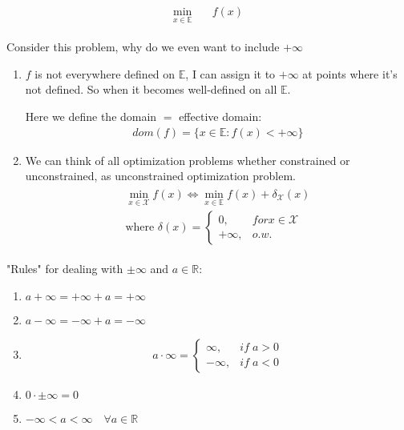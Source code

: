 \documentclass[11pt]{article}
\begin{document}
\begin{align*}
    \begin{aligned}
        \min_{x \in \mathbb{E}} &\quad f(x)
    \end{aligned}
\end{align*}

Consider this problem, why do we even want to include $+\infty$
\begin{enumerate}
    \item $f$ is not everywhere defined  on $\mathbb{E}$, I can assign it to $+\infty$ at points where it's not
    defined. So when it becomes well-defined on all $\mathbb{E}$.
    
    Here we define the domain $=$ effective domain:
    \begin{align*}
        dom(f) = \{ x \in \mathbb{E}: f(x) < +\infty \}
    \end{align*}
    \item We can think of all optimization problems whether constrained or unconstrained, as unconstrained optimization
    problem.
    \begin{align*}
        \begin{aligned}
            \min_{x\in \mathcal{X}}  f(x) \iff \min_{x \in \mathbb{E}} f(x) + \delta_{\mathcal{X}}(x)\\
            \text{where } \delta(x) = 
            \begin{cases} 
            0, &  for x \in \mathcal{X}\\ 
            +\infty, &  o.w. 
            \end{cases}
        \end{aligned}
    \end{align*}
\end{enumerate}

"Rules" for dealing with $\pm \infty$ and $a \in \mathbb{R}$:
\begin{enumerate}
    \item $a+\infty = +\infty + a = +\infty$
    \item $a-\infty = -\infty + a = -\infty$
    \item 
    \begin{align*}
        a \cdot \infty = 
        \begin{cases} 
        \infty, &if \;a > 0  \\ 
        -\infty, &if \;a < 0
        \end{cases}
    \end{align*}
    \item $0 \cdot \pm \infty = 0$
    \item $-\infty < a < \infty \quad \forall a \in \mathbb{R}$
\end{enumerate}
\end{document}
